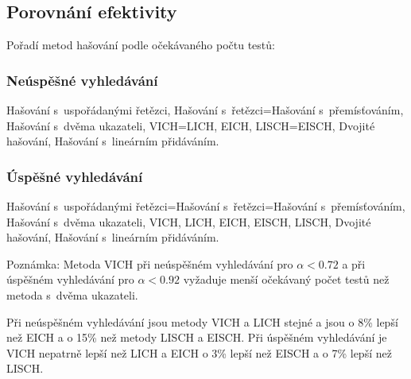 \documentclass[a4paper,12pt]{article}
\begin{document}
\subsection{Porovnání efektivity}

Pořadí metod hašování podle očekávaného počtu 
testů:
\subsubsection{Neúspěšné vyhledávání}

\phantom{---}Hašování s~uspořádanými řetězci,\newline 
\phantom{---}Hašování s~řetězci=Hašování s~přemísťováním,\newline 
\phantom{---}Hašování s~dvěma ukazateli,\newline 
\phantom{---}VICH=LICH,\newline 
\phantom{---}EICH,\newline 
\phantom{---}LISCH=EISCH,\newline 
\phantom{---}Dvojité hašování,\newline 
\phantom{---}Hašování s~lineárním přidáváním.

\subsubsection{Úspěšné vyhledávání}

\phantom{---}Hašování s~uspořádanými řetězci=Hašování s~řetězci=Hašo\-vá\-ní s~přemísťováním,\newline 
\phantom{---}Hašování s~dvěma ukazateli,\newline 
\phantom{---}VICH,\newline 
\phantom{---}LICH,\newline 
\phantom{---}EICH,\newline 
\phantom{---}EISCH,\newline 
\phantom{---}LISCH,\newline 
\phantom{---}Dvojité hašování,\newline 
\phantom{---}Hašování s~lineárním přidáváním.

Poznámka: Metoda VICH při neúspěšném vyhledávání pro 
$\alpha <0.72$ a při úspěšném vy\-hledávání pro $
\alpha <0.92$ 
vyžaduje menší očekávaný počet testů než 
metoda s~dvěma ukazateli.

Při neúspěšném vyhledávání jsou metody VICH a LICH stejné a jsou o 8\% lepší než 
EICH a o 15\% než metody LISCH a EISCH. Při úspěšném vyhledávání 
je VICH nepatrně lepší než LICH a EICH o 3\% lepší než 
EISCH a o 7\% lepší než LISCH.
\end{document}

